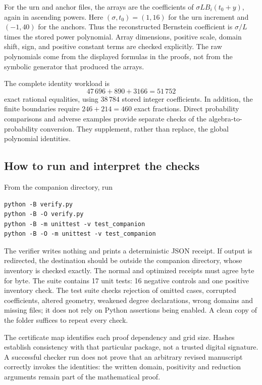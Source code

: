 \documentclass[11pt,a4paper]{article}
\theoremstyle{remark}
\numberwithin{equation}{section}
\begin{document}
For the urn and anchor files, the arrays are the coefficients of
\(\sigma L B_i(t_0+y)\), again in ascending powers.
Here \((\sigma,t_0)=(1,16)\) for the urn increment and
\((-1,40)\) for the anchors.
Thus the reconstructed Bernstein coefficient is
\(\sigma/L\) times the stored power polynomial.
Array dimensions, positive scale, domain shift, sign, and positive
constant terms are checked explicitly.
The raw polynomials come from the displayed formulas in the proofs,
not from the symbolic generator that produced the arrays.

The complete identity workload is
\[
 47\,696+890+3166=51\,752
\]
exact rational equalities, using \(38\,784\) stored integer coefficients.
In addition, the finite boundaries require \(246+214=460\) exact
fractions. Direct probability comparisons and adverse examples
provide separate checks of the algebra-to-probability conversion.
They supplement, rather than replace, the global polynomial identities.

\newpage
\subsection{How to run and interpret the checks}
From the companion directory, run
\begin{verbatim}
python -B verify.py
python -B -O verify.py
python -B -m unittest -v test_companion
python -B -O -m unittest -v test_companion
\end{verbatim}
The verifier writes nothing and prints a deterministic JSON receipt.
If output is redirected, the destination should be outside the companion
directory, whose inventory is checked exactly.
The normal and optimized receipts must agree byte for byte.
The suite contains 17 unit tests: 16 negative controls and one positive
inventory check.
The test suite checks rejection of omitted cases, corrupted coefficients,
altered geometry, weakened degree declarations, wrong domains and
missing files; it does not rely on Python assertions being enabled.
A clean copy of the folder suffices to repeat every check.

The certificate map identifies each proof dependency and grid size.
Hashes establish consistency with that particular package, not a
trusted digital signature. A successful checker run does not prove
that an arbitrary revised manuscript correctly invokes the identities:
the written domain, positivity and reduction arguments remain part
of the mathematical proof.
\end{document}
